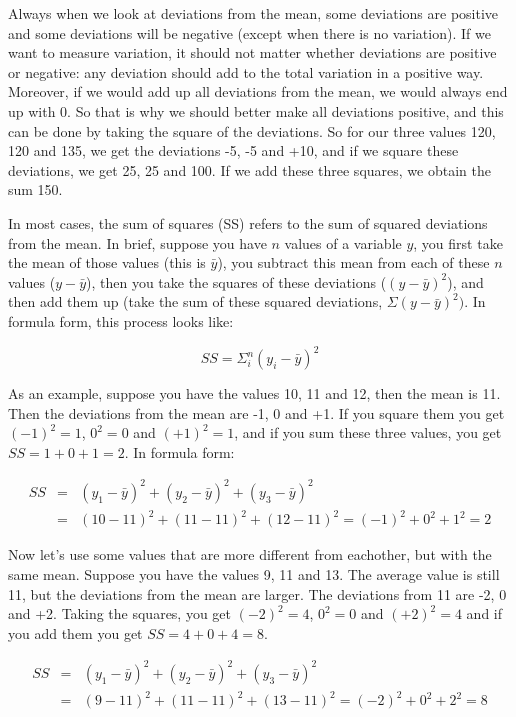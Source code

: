 \documentclass[]{book}\usepackage[]{graphicx}\usepackage[]{color}
\begin{document}
Always when we look at deviations from the mean, some deviations are positive and some deviations will be negative (except when there is no variation). If we want to measure variation, it should not matter whether deviations are positive or negative: any deviation should add to the total variation in a positive way. Moreover, if we would add up all deviations from the mean, we would always end up with 0. So that is why we should better make all deviations positive, and this can be done by taking the square of the deviations. So for our three values 120, 120 and 135, we get the deviations -5, -5 and +10, and if we square these deviations, we get 25, 25 and 100. If we add these three squares, we obtain the sum 150.

In most cases, the sum of squares (SS) refers to the sum of squared deviations from the mean. In brief, suppose you have $n$ values of a variable $y$, you first take the mean of those values (this is $\bar{y}$), you subtract this mean from each of these $n$ values ($y-\bar{y}$), then you take the squares of these deviations ($(y-\bar{y})^2$), and then add them up (take the sum of these squared deviations, $\Sigma (y-\bar{y})^2)$. In formula form, this process looks like:

\begin{equation}
SS = \Sigma_i^n (y_i-\bar{y})^2
\end{equation}

As an example, suppose you have the values 10, 11 and 12, then the mean is 11. Then the deviations from the mean are -1, 0 and +1. If you square them you get $(-1)^2=1$, $0^2=0$ and $(+1)^2=1$, and if you sum these three values, you get $SS=1+0+1=2$. In formula form:


\begin{eqnarray}
SS &=& (y_1-\bar{y})^2 + (y_2-\bar{y})^2 +(y_3-\bar{y})^2 \\
&=& (10-11)^2 + (11-11)^2 +(12-11)^2 = (-1)^2 + 0^2 + 1^2=2 \nonumber
\end{eqnarray}

Now let's use some values that are more different from eachother, but with the same mean. Suppose you have the values 9, 11 and 13. The average value is still 11, but the deviations from the mean are larger. The deviations from 11 are -2, 0 and +2. Taking the squares, you get $(-2)^2=4$, $0^2=0$ and $(+2)^2=4$ and if you add them you get $SS=4+0+4=8$.

\begin{eqnarray}
SS &=& (y_1-\bar{y})^2 + (y_2-\bar{y})^2 +(y_3-\bar{y})^2 \\
&=& (9-11)^2 + (11-11)^2 +(13-11)^2= (-2)^2 + 0^2 + 2^2=8 \nonumber
\end{eqnarray}
\end{document}
